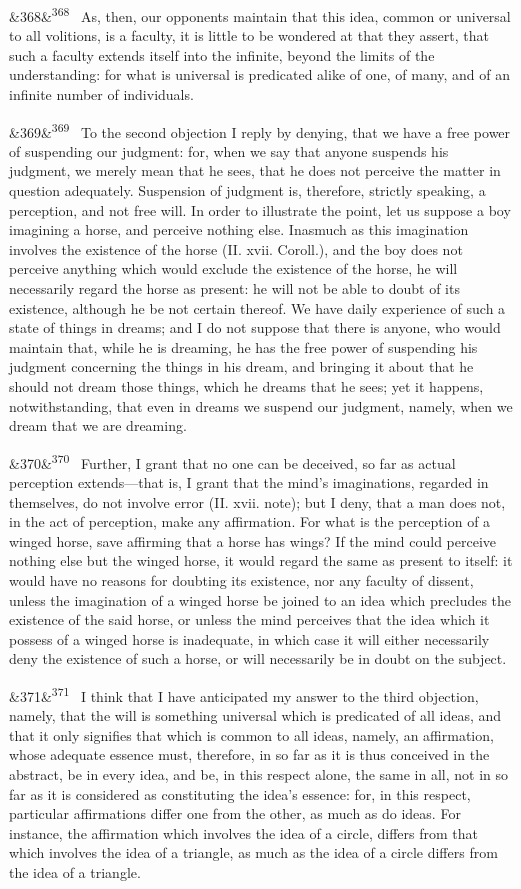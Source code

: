 \documentclass[12pt]{article}
\newcommand{\para}[1][]{\par\noindent\ifx&#1&\else\textsuperscript{\footnotesize #1}~\fi}
\begin{document}
\para[368] As, then, our opponents maintain that this idea, common or universal to all volitions, is a faculty, it is little to be wondered at that they assert, that such a faculty extends itself into the infinite, beyond the limits of the understanding: for what is universal is predicated alike of one, of many, and of an infinite number of individuals.

\para[369] To the second objection I reply by denying, that we have a free power of suspending our judgment: for, when we say that anyone suspends his judgment, we merely mean that he sees, that he does not perceive the matter in question adequately. Suspension of judgment is, therefore, strictly speaking, a perception, and not free will. In order to illustrate the point, let us suppose a boy imagining a horse, and perceive nothing else. Inasmuch as this imagination involves the existence of the horse (II. xvii. Coroll.), and the boy does not perceive anything which would exclude the existence of the horse, he will necessarily regard the horse as present: he will not be able to doubt of its existence, although he be not certain thereof. We have daily experience of such a state of things in dreams; and I do not suppose that there is anyone, who would maintain that, while he is dreaming, he has the free power of suspending his judgment concerning the things in his dream, and bringing it about that he should not dream those things, which he dreams that he sees; yet it happens, notwithstanding, that even in dreams we suspend our judgment, namely, when we dream that we are dreaming.

\para[370] Further, I grant that no one can be deceived, so far as actual perception extends---that is, I grant that the mind's imaginations, regarded in themselves, do not involve error (II. xvii. note); but I deny, that a man does not, in the act of perception, make any affirmation. For what is the perception of a winged horse, save affirming that a horse has wings? If the mind could perceive nothing else but the winged horse, it would regard the same as present to itself: it would have no reasons for doubting its existence, nor any faculty of dissent, unless the imagination of a winged horse be joined to an idea which precludes the existence of the said horse, or unless the mind perceives that the idea which it possess of a winged horse is inadequate, in which case it will either necessarily deny the existence of such a horse, or will necessarily be in doubt on the subject.

\para[371] I think that I have anticipated my answer to the third objection, namely, that the will is something universal which is predicated of all ideas, and that it only signifies that which is common to all ideas, namely, an affirmation, whose adequate essence must, therefore, in so far as it is thus conceived in the abstract, be in every idea, and be, in this respect alone, the same in all, not in so far as it is considered as constituting the idea's essence: for, in this respect, particular affirmations differ one from the other, as much as do ideas. For instance, the affirmation which involves the idea of a circle, differs from that which involves the idea of a triangle, as much as the idea of a circle differs from the idea of a triangle.
\end{document}
